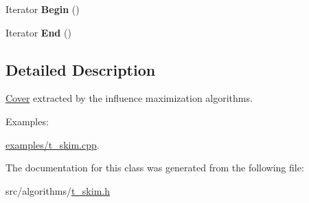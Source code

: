 \begin{DoxyCompactItemize}
\item 
\hypertarget{classall__distance__sketch_1_1Cover_a13a97b2eb936508eeff66e9e938b7906}{}Iterator {\bfseries Begin} ()\label{classall__distance__sketch_1_1Cover_a13a97b2eb936508eeff66e9e938b7906}

\item 
\hypertarget{classall__distance__sketch_1_1Cover_a33a0fe311d66e5ce810a1c6f6cebcbe0}{}Iterator {\bfseries End} ()\label{classall__distance__sketch_1_1Cover_a33a0fe311d66e5ce810a1c6f6cebcbe0}

\end{DoxyCompactItemize}


\subsection{Detailed Description}
\hyperlink{classall__distance__sketch_1_1Cover}{Cover} extracted by the influence maximization algorithms. \begin{Desc}
\item[Examples\+: ]\par
\hyperlink{examples_2t_skim_8cpp-example}{examples/t\+\_\+skim.\+cpp}.\end{Desc}


The documentation for this class was generated from the following file\+:\begin{DoxyCompactItemize}
\item 
src/algorithms/\hyperlink{t__skim_8h}{t\+\_\+skim.\+h}\end{DoxyCompactItemize}
